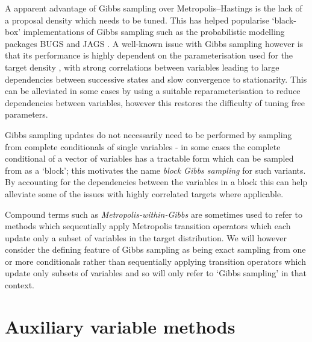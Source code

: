 A apparent advantage of Gibbs sampling over Metropolis--Hastings is the lack of a proposal density which needs to be tuned. This has helped popularise `black-box' implementations of Gibbs sampling such as the probabilistic modelling packages BUGS \citep{gilks1994language} and JAGS \citep{plummer2003jags}. A well-known issue with Gibbs sampling however is that its performance is highly dependent on the parameterisation used for the target density \citep{raftery1991many}, with strong correlations between variables leading to large dependencies between successive states and slow convergence to stationarity. This can be alleviated in some cases by using a suitable reparameterisation to reduce dependencies between variables, however this restores the difficulty of tuning free parameters.

Gibbs sampling updates do not necessarily need to be performed by sampling from complete conditionals of single variables - in some cases the complete conditional of a vector of variables has a tractable form which can be sampled from as a `block'; this motivates the name \emph{block Gibbs sampling} for such variants. By accounting for the dependencies between the variables in a block this can help alleviate some of the issues with highly correlated targets where applicable.

Compound terms such as \emph{Metropolis-within-Gibbs} are sometimes used to refer to methods which sequentially apply Metropolis transition operators which each update only a subset of variables in the target distribution. We will however consider the defining feature of Gibbs sampling as being exact sampling from one or more conditionals rather than sequentially applying transition operators which update only subsets of variables and so will only refer to `Gibbs sampling' in that context.

\section{Auxiliary variable methods}

